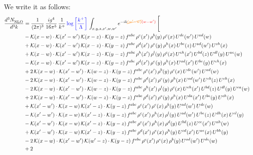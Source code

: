 \documentclass[9pt]{article}
\numberwithin{equation}{section}
\begin{document}
We write it as follows: 
\begin{align}
     \frac{d^{3}N_{\rm NLO}^{\rm}}{d^{3}k}  & = \frac{1}{(2\pi)^{3}}\, \frac{ig^{4}}{16\pi^{5}}\, \frac{1}{k^{+}}\,{\color{blue}\log{\left[\frac{k^{+}}{\Lambda}\right]}}\, \int_{x,y,z,x^{\prime},w,w^{\prime}}e^{-ik{\color{orange}\cancel{(w^{\prime}-w)}}{\color{red}(w-w^{\prime})}}\, \Bigg[\notag \\ & -\mathcal{K}(x-w)\cdot \mathcal{K}(x'-w')\, \mathcal{K}(x-z)\cdot \mathcal{K}(y-z)\, f^{abc}\, \rho^{e}(x')\,\rho^{b}(y)\,\rho^{c}(x)\,U^{de}(w')\,U^{ad}(w)\notag \\ & + \mathcal{K}(x-w)\cdot \mathcal{K}(x'-w')\, \mathcal{K}(x-z)\cdot \mathcal{K}(y-z)\, f^{abc}\, \rho^{d}(x')\,\rho^{e}(y)\,\rho^{h}(x)\,U^{be}(z)\,U^{ad}(w')\,U^{ch}(x)\notag \\ & + \mathcal{K}(x-w)\cdot \mathcal{K}(x'-w')\, \mathcal{K}(x-z)\cdot \mathcal{K}(y-z)\, f^{abc}\, \rho^{h}(x')\,\rho^{l}(y)\,\rho^{c}(x)\,U^{eh}(x')\,U^{bd}(z)\,U^{dl}(y)\,U^{ae}(w)\notag \\ & -\mathcal{K}(x-w)\cdot \mathcal{K}(x'-w')\, \mathcal{K}(x-z)\cdot \mathcal{K}(y-z)\, f^{abc}\, \rho^{d}(x')\,\rho^{e}(y)\,\rho^{h}(x)\,U^{ad}(x')\,U^{be}(y)\,U^{ch}(x)\notag \\ & + 2\,\mathcal{K}(x-w)\cdot \mathcal{K}(x'-w')\cdot \mathcal{K}(w-z)\cdot \mathcal{K}(y-z)\, f^{abc}\, \rho^{e}(x')\,\rho^{b}(y)\,\rho^{c}(x)\,U^{de}(w')\,U^{ad}(w)\notag \\ & - 2\,\mathcal{K}(x-w)\cdot \mathcal{K}(x'-w')\cdot \mathcal{K}(w-z)\cdot \mathcal{K}(y-z)\, f^{abc}\, \rho^{d}(x')\,\rho^{e}(y)\,\rho^{h}(x)\,U^{ad}(w')\,U^{eb}(z)\,U^{ch}(x)\notag \\ & - 2\,\mathcal{K}(x-w)\cdot \mathcal{K}(x'-w')\cdot \mathcal{K}(w-z)\cdot \mathcal{K}(y-z)\, f^{abc}\, \rho^{h}(x')\,\rho^{l}(y)\,\rho^{c}(x)\,U^{eh}(x')\,U^{bd}(z)\,U^{dl}(y)\,U^{ea}(w)\notag \\ &  + 2\,\mathcal{K}(x-w)\cdot \mathcal{K}(x'-w')\cdot \mathcal{K}(w-z)\cdot \mathcal{K}(y-z)\, f^{abc}\, \rho^{d}(x')\,\rho^{e}(y)\,\rho^{h}(x)\,U^{da}(x')\,U^{be}(y)\,U^{ch}(x)\notag \\ & + \mathcal{K}(x'-w')\cdot \mathcal{K}(x-w)\, \mathcal{K}(x'-z)\cdot \mathcal{K}(y-z)\, f^{abc}\,\rho^{c}(x')\,\rho^{e}(x)\,\rho^{b}(y)\, U^{ad}(w')\,U^{de}(w)\notag \\ & -\mathcal{K}(x'-w')\cdot \mathcal{K}(x-w)\, \mathcal{K}(x'-z)\cdot \mathcal{K}(y-z)\, f^{abc}\,\rho^{c}(x')\,\rho^{h}(x)\,\rho^{l}(y)\, U^{ad}(w')\,U^{be}(z)\,U^{dh}(x)\,U^{el}(y)\notag \\ & -\mathcal{K}(x'-w')\cdot \mathcal{K}(x-w)\, \mathcal{K}(x'-z)\cdot \mathcal{K}(y-z)\, f^{abc}\,\rho^{e}(x')\,\rho^{h}(x)\,\rho^{d}(y)\, U^{bd}(z)\,U^{ce}(x')\,U^{ah}(w)\notag \\ & +\mathcal{K}(x'-w')\cdot \mathcal{K}(x-w)\, \mathcal{K}(x'-z)\cdot \mathcal{K}(y-z)\, f^{abc}\,\rho^{d}(x')\,\rho^{e}(x)\,\rho^{h}(y)\, U^{cd}(x')\,U^{ae}(x)\,U^{bh}(y)\notag \\ & -2\, \mathcal{K}(x-w)\cdot \mathcal{K}(x'-w')\, \mathcal{K}(w'-z)\cdot \mathcal{K}(y-z)\, f^{abc}\,\rho^{c}(x')\,\rho^{e}(x)\,\rho^{b}(y)\,U^{ad}(w')\,U^{de}(w)\notag \\ & +2\, 
\end{align}
\end{document}
